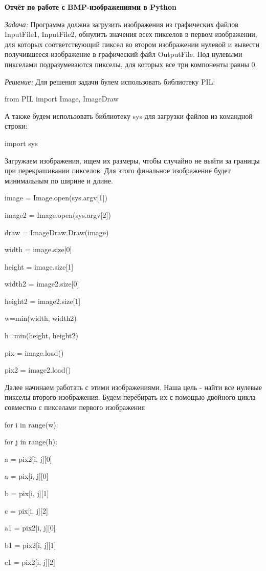 \documentclass{article}
\newcommand\tab[1][1cm]{\hspace*{#1}}
\begin{document}
\begin{center}
{\large\bf Отчёт по работе с BMP-изображениями в Python}
\end{center}

\textit{Задача:} Программа должна загрузить изображения из графических файлов InputFile1, InputFile2, обнулить значения всех пикселов в первом изображении, для которых соответствующий пиксел во втором изображении нулевой и вывести получившееся изображение в графический файл OutputFile. Под нулевыми пикселами подразумеваются пикселы, для которых все три компоненты равны 0.

 
\textit{Решение:}  Для решения задачи булем использовать библиотеку PIL:

\textsf{from PIL import Image, ImageDraw }

А также будем использовать библиотеку sys для загрузки файлов из командной строки:

\textsf{import sys}

Загружаем изображения, ищем их размеры, чтобы случайно не выйти за границы при перекрашивании пикселов. Для этого финальное изображение будет минимальным по ширине и длине.

{

image = Image.open(sys.argv[1]) 

image2 = Image.open(sys.argv[2]) 

draw = ImageDraw.Draw(image)  

width = image.size[0]  

height = image.size[1]  

width2 = image2.size[0] 

height2 = image2.size[1] 

w=min(width, width2)

h=min(height, height2)

pix = image.load() 

pix2 = image2.load() }


Далее начинаем работать с этими изображениями. Наша цель - найти все нулевые пикселы второго изображения. Будем перебирать их с помощью двойного цикла совместно с пикселами первого изображения
 
{

for i in range(w):

\tab[0.5cm] for j in range(h):

\tab[1cm] a = pix2[i, j][0] 

\tab[1cm] a = pix[i, j][0]

\tab[1cm] b = pix[i, j][1]

\tab[1cm] c = pix[i, j][2]

\tab[1cm] a1 = pix2[i, j][0]

\tab[1cm] b1 = pix2[i, j][1]

\tab[1cm] c1 = pix2[i, j][2] }
\end{document}
